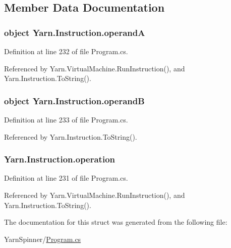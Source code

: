 \subsection{Member Data Documentation}
\hypertarget{a00115_ab5d386faa0d3dbc23db80f8e62706afd}{
\subsubsection[{operand\-A}]{\setlength{\rightskip}{0pt plus 5cm}object Yarn.\-Instruction.\-operand\-A}}\label{a00115_ab5d386faa0d3dbc23db80f8e62706afd}


Definition at line 232 of file Program.\-cs.



Referenced by Yarn.\-Virtual\-Machine.\-Run\-Instruction(), and Yarn.\-Instruction.\-To\-String().

\hypertarget{a00115_a56348c6fe7eb919b7277afc06e5b224a}{
\subsubsection[{operand\-B}]{\setlength{\rightskip}{0pt plus 5cm}object Yarn.\-Instruction.\-operand\-B}}\label{a00115_a56348c6fe7eb919b7277afc06e5b224a}


Definition at line 233 of file Program.\-cs.



Referenced by Yarn.\-Instruction.\-To\-String().

\hypertarget{a00115_a566bf5f7198cc353ea5c3710cb3a31cb}{
\subsubsection[{operation}]{ Yarn.\-Instruction.\-operation}}\label{a00115_a566bf5f7198cc353ea5c3710cb3a31cb}


Definition at line 231 of file Program.\-cs.



Referenced by Yarn.\-Virtual\-Machine.\-Run\-Instruction(), and Yarn.\-Instruction.\-To\-String().



The documentation for this struct was generated from the following file\-:\begin{DoxyCompactItemize}
\item 
Yarn\-Spinner/\hyperlink{a00292}{Program.\-cs}\end{DoxyCompactItemize}

